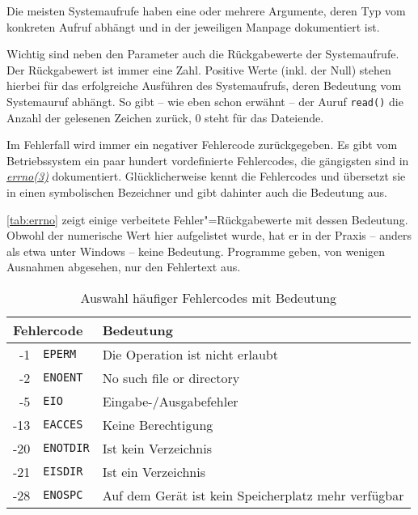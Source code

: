 
Die meisten Systemaufrufe haben eine oder mehrere Argumente, deren Typ vom konkreten Aufruf abhängt
und in der jeweiligen Manpage dokumentiert ist.

Wichtig sind neben den Parameter auch die Rückgabewerte der Systemaufrufe. Der Rückgabewert ist
immer eine Zahl. Positive Werte (inkl. der Null) stehen hierbei für das erfolgreiche Ausführen
des Systemaufrufs, deren Bedeutung vom Systemauruf abhängt. So gibt -- wie eben schon erwähnt --
der Auruf \texttt{read()} die Anzahl der gelesenen Zeichen zurück, 0 steht für das Dateiende. 

Im Fehlerfall wird immer ein negativer Fehlercode zurückgegeben. Es gibt vom Betriebssystem ein 
paar hundert vordefinierte Fehlercodes, die gängigsten sind in
\href{http://man7.org/linux/man-pages/man3/errno.3.html}{\emph{errno(3)}} dokumentiert.
Glücklicherweise kennt \strace{} die Fehlercodes und übersetzt sie in einen symbolischen Bezeichner
und gibt dahinter auch die Bedeutung aus.

\autoref{tab:errno} zeigt einige verbeitete Fehler"=Rückgabewerte mit dessen Bedeutung. Obwohl der
numerische Wert hier aufgelistet wurde, hat er in der Praxis -- anders als etwa unter Windows --
keine Bedeutung. Programme geben, von wenigen Ausnahmen abgesehen, nur den Fehlertext aus.

\begin{table}[b]
  \centering\small
  \begin{tabular}{|r@{~~}l|p{5.2cm}|}
    \hline
    \multicolumn{2}{|l|}{\textbf{Fehlercode}}        & \textbf{Bedeutung} \\
    \hline
    -1      & \texttt{EPERM}     & Die Operation ist nicht erlaubt \\
    -2      & \texttt{ENOENT}    & No such file or directory \\
    -5      & \texttt{EIO}       & Eingabe-/Ausgabefehler \\
    -13     & \texttt{EACCES}    & Keine Berechtigung \\
    -20     & \texttt{ENOTDIR}   & Ist kein Verzeichnis \\
    -21     & \texttt{EISDIR}    & Ist ein Verzeichnis \\
    -28     & \texttt{ENOSPC}    & Auf dem Gerät ist kein Speicherplatz mehr verfügbar \\
    \hline
  \end{tabular}
  \caption{Auswahl häufiger Fehlercodes mit Bedeutung}
  \label{tab:errno}
\end{table}

\vspace{2cm}